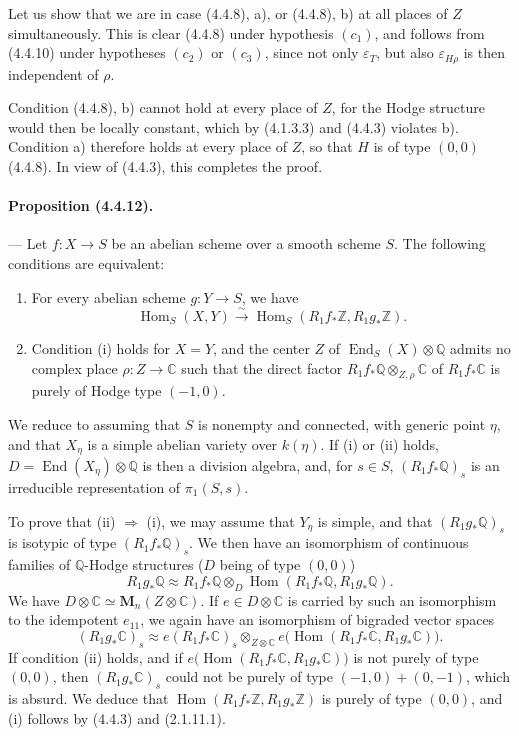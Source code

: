 \documentclass[10pt]{article}
\newcommand{\C}{\mathbb C}
\newcommand{\Q}{\mathbb Q}
\newcommand{\Z}{\mathbb Z}
\newcommand{\Hom}{\operatorname{Hom}}
\newcommand{\iso}{\xrightarrow{\sim}}
\providecommand{\End}{\operatorname{End}}
\begin{document}
Let us show that we are in case (4.4.8), a), or (4.4.8), b) at all places of $Z$ simultaneously. This is clear (4.4.8) under hypothesis $(c_1)$, and follows from (4.4.10) under hypotheses $(c_2)$ or $(c_3)$, since not only $\varepsilon_T$, but also $\varepsilon_{H\rho}$ is then independent of $\rho$.

Condition (4.4.8), b) cannot hold at every place of $Z$, for the Hodge structure would then be locally constant, which by (4.1.3.3) and (4.4.3) violates b). Condition a) therefore holds at every place of $Z$, so that $H$ is of type $(0,0)$ (4.4.8). In view of (4.4.3), this completes the proof.

\paragraph{Proposition (4.4.12).} --- Let $f:X\to S$ be an abelian scheme over a smooth scheme $S$. The following conditions are equivalent:
\begin{enumerate}[label=(\roman*)]
\item For every abelian scheme $g:Y\to S$, we have
\[
\Hom_S(X,Y)\iso \Hom_S(R_1f_*\Z,R_1g_*\Z).
\]
\item Condition (i) holds for $X=Y$, and the center $Z$ of $\End_S(X)\otimes\Q$ admits no complex place $\rho:Z\to\C$ such that the direct factor $R_1f_*\Q\otimes_{Z,\rho}\C$ of $R_1f_*\C$ is purely of Hodge type $(-1,0)$.
\end{enumerate}




We reduce to assuming that $S$ is nonempty and connected, with generic point $\eta$, and that $X_\eta$ is a simple abelian variety over $k(\eta)$. If (i) or (ii) holds, $D=\End(X_\eta)\otimes\Q$ is then a division algebra, and, for $s\in S$, $(R_1f_*\Q)_s$ is an irreducible representation of $\pi_1(S,s)$.

To prove that (ii) $\Rightarrow$ (i), we may assume that $Y_\eta$ is simple, and that $(R_1g_*\Q)_s$ is isotypic of type $(R_1f_*\Q)_s$. We then have an isomorphism of continuous families of $\Q$-Hodge structures ($D$ being of type $(0,0)$)
\[
R_1g_*\Q\approx R_1f_*\Q\otimes_D
\Hom(R_1f_*\Q,R_1g_*\Q).
\]
We have $D\otimes\C\simeq \mathbf{M}_n(Z\otimes\C)$. If $e\in D\otimes\C$ is carried by such an isomorphism to the idempotent $e_{11}$, we again have an isomorphism of bigraded vector spaces
\[
(R_1g_*\C)_s\approx e(R_1f_*\C)_s\otimes_{Z\otimes\C}
e\bigl(\Hom(R_1f_*\C,R_1g_*\C)\bigr).
\]
If condition (ii) holds, and if $e\bigl(\Hom(R_1f_*\C,R_1g_*\C)\bigr)$ is not purely of type $(0,0)$, then $(R_1g_*\C)_s$ could not be purely of type $(-1,0)+(0,-1)$, which is absurd. We deduce that $\Hom(R_1f_*\Z,R_1g_*\Z)$ is purely of type $(0,0)$, and (i) follows by (4.4.3) and (2.1.11.1).
\end{document}
